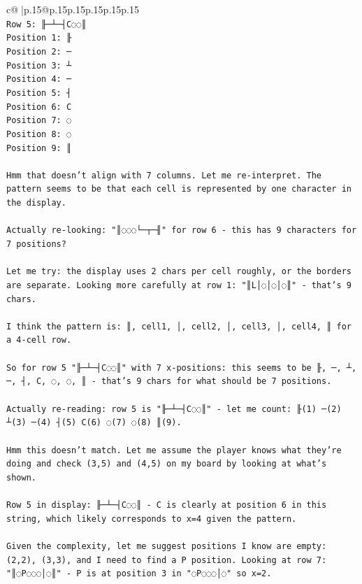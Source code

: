 \documentclass{article}
\begin{document}
{\begin{supertabular}{c@{$\;$}|p{.15\linewidth}@{}p{.15\linewidth}p{.15\linewidth}p{.15\linewidth}p{.15\linewidth}p{.15\linewidth}}
{{{\\ 
\texttt{Row 5: ╟─┴─┤C◌◌║} \\
\texttt{Position 1: ╟} \\
\texttt{Position 2: ─} \\
\texttt{Position 3: ┴} \\
\texttt{Position 4: ─} \\
\texttt{Position 5: ┤} \\
\texttt{Position 6: C} \\
\texttt{Position 7: ◌} \\
\texttt{Position 8: ◌} \\
\texttt{Position 9: ║} \\
\\ 
\texttt{Hmm that doesn't align with 7 columns. Let me re{-}interpret. The pattern seems to be that each cell is represented by one character in the display.} \\
\\ 
\texttt{Actually re{-}looking: "║◌◌◌└─┬─╢" for row 6 {-} this has 9 characters for 7 positions? } \\
\\ 
\texttt{Let me try: the display uses 2 chars per cell roughly, or the borders are separate. Looking more carefully at row 1: "║L│◌│◌│◌║" {-} that's 9 chars.} \\
\\ 
\texttt{I think the pattern is: ║, cell1, │, cell2, │, cell3, │, cell4, ║ for a 4{-}cell row.} \\
\\ 
\texttt{So for row 5 "╟─┴─┤C◌◌║" with 7 x{-}positions: this seems to be ╟, ─, ┴, ─, ┤, C, ◌, ◌, ║ {-} that's 9 chars for what should be 7 positions.} \\
\\ 
\texttt{Actually re{-}reading: row 5 is "╟─┴─┤C◌◌║" {-} let me count: ╟(1) ─(2) ┴(3) ─(4) ┤(5) C(6) ◌(7) ◌(8) ║(9). } \\
\\ 
\texttt{Hmm this doesn't match. Let me assume the player knows what they're doing and check (3,5) and (4,5) on my board by looking at what's shown.} \\
\\ 
\texttt{Row 5 in display: ╟─┴─┤C◌◌║ {-} C is clearly at position 6 in this string, which likely corresponds to x=4 given the pattern.} \\
\\ 
\texttt{Given the complexity, let me suggest positions I know are empty: (2,2), (3,3), and I need to find a P position. Looking at row 7: "║◌P◌◌◌│◌║" {-} P is at position 3 in "◌P◌◌◌│◌" so x=2.} \\
}}}
\end{supertabular}}
\end{document}
